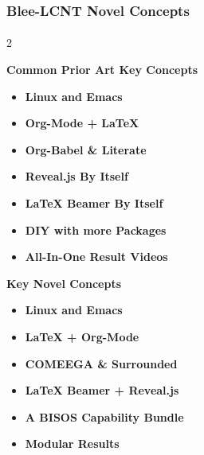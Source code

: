 \begin{whenOrg}
\begin{verblatex}

\begin{frame}[fragile,plain,label=novelConcepts]
    \frametitle{Blee-LCNT Novel Concepts}
    \framesubtitle{}

   \begin{multicols}{2}

     \color{magenta} \textbf{Common Prior Art Key Concepts}

      \begin{itemize}
        \item \color{black} \textbf{Linux and Emacs}
        \item \color{violet} \textbf{Org-Mode + LaTeX}
        \item \color{violet} \textbf{Org-Babel \& Literate}
        \item \color{violet}  \textbf{Reveal.js By Itself}
        \item \color{violet}  \textbf{LaTeX Beamer By Itself}
        \item \color{violet}  \textbf{DIY with more Packages}
        \item \color{violet}  \textbf{All-In-One Result Videos}

      \end{itemize}

      \columnbreak

      \color{blue} \textbf{Key Novel Concepts}

      \begin{itemize}
        \item \color{black} \textbf{Linux and Emacs}
        \item \color{teal} \textbf{LaTeX + Org-Mode}
        \item \color{teal} \textbf{COMEEGA \& Surrounded}
        \item \color{teal}  \textbf{LaTeX Beamer + Reveal.js}
        \item \color{teal}  \textbf{A BISOS Capability Bundle}
        \item \color{teal}  \textbf{Modular Results}
      \end{itemize}


\end{multicols}
\end{frame}
\end{verblatex}
\end{whenOrg}
